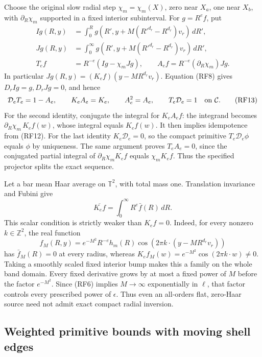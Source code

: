 \documentclass[10pt,a4paper]{article}
\begin{document}
Choose the original slow radial step \(\chi_m=\chi_m(X)\), zero
near \(X_a\), one near \(X_b\), with \(\partial_R\chi_m\)
supported in a fixed interior subinterval. For \(g=R^ef\), put
\[
\begin{split}
Ig(R,y)&=\int_0^R g(R',y+M(R'^{d_r}-R^{d_r})v_r)\,dR',\\
Jg(R,y)&=\int_0^\infty g(R',y+M(R'^{d_r}-R^{d_r})v_r)\,dR',\\
T_ef&=R^{-e}(Ig-\chi_mJg),\qquad
A_ef=R^{-e}(\partial_R\chi_m)Jg.
\end{split}
\tag{RF12}
\]
In particular \(Jg(R,y)=(K_ef)(y-MR^{d_r}v_r)\).
Equation (RF8) gives \(D_rIg=g,D_rJg=0\), and hence
\[
\mathcal D_eT_e=1-A_e,\qquad K_eA_e=K_e,
\qquad A_e^2=A_e,\qquad T_e\mathcal D_e=1\quad\hbox{on }\mathcal C.
\tag{RF13}
\]
For the second identity, conjugate the integral for \(K_eA_ef\):
the integrand becomes \(\partial_R\chi_m\,K_ef(w)\), whose integral
equals \(K_ef(w)\). It then implies idempotence from (RF12).
For the last identity \(K_e\mathcal D_e=0\), so the compact primitive
\(T_e\mathcal D_e\phi\) equals \(\phi\) by uniqueness.
The same argument proves \(T_eA_e=0\), since the conjugated partial
integral of \(\partial_R\chi_mK_ef\) equals \(\chi_mK_ef\).
Thus the specified projector splits the exact sequence.

Let a bar mean Haar average on \(\mathbb T^2\), with total mass one.
Translation invariance and Fubini give
\[
\overline{K_ef}=\int_0^\infty R^e\bar f(R)\,dR.
\tag{RF14}
\]
This scalar condition is strictly weaker than \(K_ef=0\).
Indeed, for every nonzero \(k\in\mathbb Z^2\), the real function
\[
f_M(R,y)=e^{-M^2}R^{-e}h_m(R)
\cos(2\pi k\cdot(y-MR^{d_r}v_r))
\tag{RF15}
\]
has \(\bar f_M(R)=0\) at every radius, whereas
\(K_ef_M(w)=e^{-M^2}\cos(2\pi k\cdot w)\ne0\).
Taking a smoothly scaled fixed interior bump makes this a family on the
whole band domain. Every fixed derivative grows by at most a fixed
power of \(M\) before the factor \(e^{-M^2}\). Since (RF6) implies
\(M\to\infty\) exponentially in \(\ell\), that factor controls
every prescribed power of \(\epsilon\). Thus even an all-orders
flat, zero-Haar source need not admit exact compact radial inversion.

\subsection{Weighted primitive bounds with moving shell edges}
\end{document}

